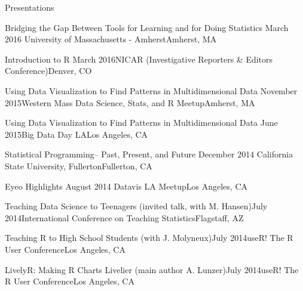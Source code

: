 \documentclass{resume} %
\begin{document}
\begin{rSection}{Presentations}


\begin{sSubsection}{Bridging the Gap Between Tools for Learning and for Doing Statistics}{ }{March 2016 }{University of Massachusetts - Amherst}{Amherst, MA}
\end{sSubsection}

\begin{sSubsection}{Introduction to R }{}{March 2016}{NICAR (Investigative Reporters \& Editors Conference)}{Denver, CO}
\end{sSubsection}

\begin{sSubsection}{Using Data Visualization to Find Patterns in Multidimensional Data}{ }{November 2015}{Western Mass Data Science, Stats, and R Meetup}{Amherst, MA}
\end{sSubsection}

\begin{sSubsection}{Using Data Visualization to Find Patterns in Multidimensional Data}{ }{June 2015}{Big Data Day LA}{Los Angeles, CA}
\end{sSubsection}

\begin{sSubsection}{Statistical Programming-- Past, Present, and Future}{ }{December 2014 }{California State University, Fullerton}{Fullerton, CA}
\end{sSubsection}

\begin{sSubsection}{Eyeo Highlights}{ }{August 2014 }{Datavis LA Meetup}{Los Angeles, CA}
\end{sSubsection}

\begin{sSubsection}{Teaching Data Science to Teenagers}{ (invited talk, with M. Hansen)}{July 2014}{International Conference on Teaching Statistics}{Flagstaff, AZ}
\end{sSubsection}

\begin{sSubsection}{Teaching R to High School Students}{ (with J. Molyneux)}{July 2014}{useR! The R User Conference}{Los Angeles, CA}
\end{sSubsection}

\begin{sSubsection}{LivelyR: Making R Charts Livelier}{ (main author A. Lunzer)}{July 2014}{useR! The R User Conference}{Los Angeles, CA}
\end{sSubsection}


\end{rSection}
\end{document}
